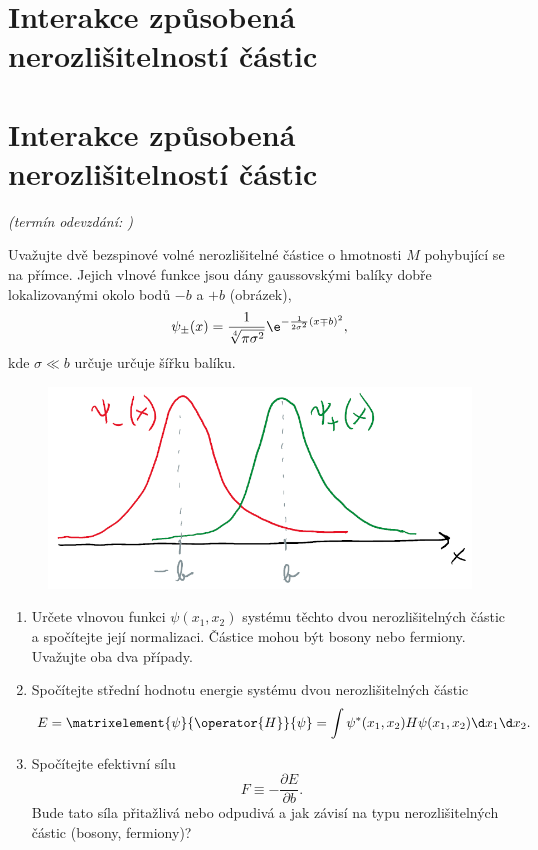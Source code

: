 \documentclass[a4paper,11pt,twoside]{book}
\def\np{\newpage}
\newcommand{\exercise}[2][]{\ifthenelse{\isempty{#1}}
	{\np\section{#2}}
	{\np\section{#2}\small{\it{(termín odevzdání: {#1})}\newline}}
}
\begin{document}
\exercise{Interakce způsobená nerozlišitelností částic}
    Uvažujte dvě bezspinové volné nerozlišitelné částice o hmotnosti $M$ pohybující se na přímce.
    Jejich vlnové funkce jsou dány gaussovskými balíky dobře lokalizovanými okolo bodů $-b$ a $+b$ (obrázek),
    \begin{equation}
        \psi_{\pm}(x)=\frac{1}{\sqrt[4]{\pi\sigma^{2}}}\e^{-\frac{1}{2\sigma^{2}}(x\mp b)^{2}},
    \end{equation}
    kde $\sigma\ll b$ určuje určuje šířku balíku.
    
    \begin{figure}[htbp!]
        \centering
        \includegraphics[width=0.5\linewidth]{Identical.png}
    \end{figure}

    \begin{enumerate}
        \item 
            Určete vlnovou funkci $\psi(x_{1},x_{2})$ systému těchto dvou nerozlišitelných částic a spočítejte její normalizaci.
            Částice mohou být bosony nebo fermiony. 
            Uvažujte oba dva případy.
        
        \item Spočítejte střední hodnotu energie systému dvou nerozlišitelných částic
            \begin{equation}
                E=\matrixelement{\psi}{\operator{H}}{\psi}=\int\psi^{*}(x_{1},x_{2})H\psi(x_{1},x_{2})\d x_{1}\d x_{2}.
            \end{equation}

        \item Spočítejte efektivní sílu
            \begin{equation}
                F\equiv-\frac{\partial E}{\partial b}.
            \end{equation}
            Bude tato síla přitažlivá nebo odpudivá a jak závisí na typu nerozlišitelných částic (bosony, fermiony)?
    \end{enumerate}
\end{document}
